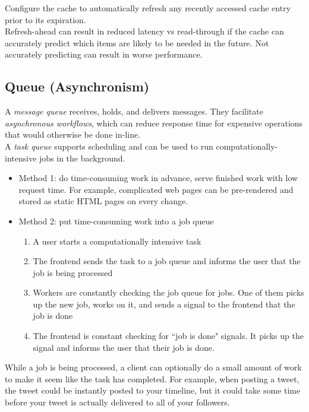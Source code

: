 \documentclass[12pt, titlepage]{article}
\begin{document}
Configure the cache to automatically refresh any recently accessed cache entry prior to its expiration. \\

Refresh-ahead can result in reduced latency vs read-through if the cache can accurately predict which items are likely to be needed in the future. Not accurately predicting can result in worse performance.

\subsection{Queue (Asynchronism)}

A \textit{message queue} receives, holds, and delivers messages. They facilitate \textit{asynchronous workflows}, which can reduce response time for expensive operations that would otherwise be done in-line. \\

A \textit{task queue} supports scheduling and can be used to run computationally-intensive jobs in the background.

\begin{itemize}
  \item Method 1: do time-consuming work in advance, serve finished work with low request time. For example, complicated web pages can be pre-rendered and stored as static HTML pages on every change.
  \item Method 2: put time-consuming work into a job queue
    \begin{enumerate}
      \item A user starts a computationally intensive task
      \item The frontend sends the task to a job queue and informs the user that the job is being processed
      \item Workers are constantly checking the job queue for jobs. One of them picks up the new job, works on it, and sends a signal to the frontend that the job is done
      \item The frontend is constant checking for ``job is done" signals. It picks up the signal and informs the user that their job is done.
    \end{enumerate}
\end{itemize}

While a job is being processed, a client can optionally do a small amount of work to make it seem like the task has completed. For example, when posting a tweet, the tweet could be instantly posted to your timeline, but it could take some time before your tweet is actually delivered to all of your followers. \\
\end{document}
